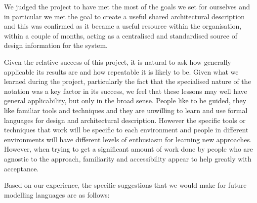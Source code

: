   We judged the project to have met the most of the goals we set for ourselves and in particular we met the goal to create a useful shared architectural description and this was confirmed as it became a useful resource within the organisation, within a couple of months, acting as a centralised and standardised source of design information for the system.

  Given the relative success of this project, it is natural to ask how generally applicable its results are and how repeatable it is likely to be.  Given what we learned during the project, particularly the fact that the specialised nature of the notation was a key factor in its success, we feel that these lessons may well have general applicability, but only in the broad sense.  People like to be guided, they like familiar tools and techniques and they are unwilling to learn and use formal languages for design and architectural description.  However the specific tools or techniques that work will be specific to each environment and people in different environments will have different levels of enthusiasm for learning new approaches.  However, when trying to get a significant amount of work done by people who are agnostic to the approach, familiarity and accessibility appear to help greatly with acceptance.

  Based on our experience, the specific suggestions that we would make for future modelling languages are as follows:

